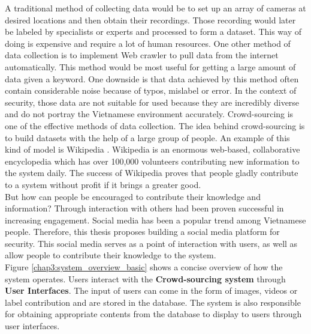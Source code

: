 
A traditional method of collecting data would be to set up an array of cameras at desired locations and then obtain their recordings. Those recording would later be labeled by specialists or experts and processed to form a dataset. This way of doing is expensive and require a lot of human resources.
One other method of data collection is to implement Web crawler to pull data from the internet automatically. This method would be most useful for getting a large amount of data given a keyword. One downside is that data achieved by this method often contain considerable noise because of typos, mislabel or error. In the context of security, those data are not suitable for used because they are incredibly diverse and do not portray the Vietnamese environment accurately.
Crowd-sourcing is one of the effective methods of data collection. The idea behind crowd-sourcing is to build datasets with the help of a large group of people. An example of this kind of model is Wikipedia 
. Wikipedia is an enormous web-based, collaborative encyclopedia which has over 100,000 volunteers contributing new information to the system daily. The success of Wikipedia proves that people gladly contribute to a system without profit if it brings a greater good. \\
But how can people be encouraged to contribute their knowledge and information? Through interaction with others had been proven successful in increasing engagement. Social media has been a popular trend among Vietnamese people. Therefore, this thesis proposes building a social media platform for security. This social media serves as a point of interaction with users, as well as allow people to contribute their knowledge to the system. \\
Figure \ref{chap3:system_overview_basic} shows a concise overview of how the system operates. Users interact with the \textbf{Crowd-sourcing system} through \textbf{User Interfaces}. The input of users can come in the form of images, videos or label contribution and are stored in the database. The system is also responsible for obtaining appropriate contents from the database to display to users through user interfaces.
